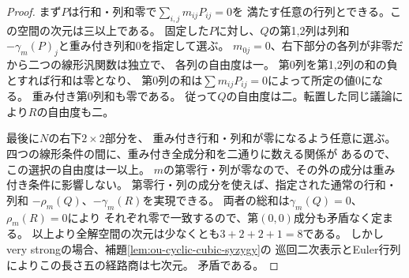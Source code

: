 \begin{proof}
まず$P$は行和・列和零で$\sum_{i,j}m_{ij}P_{ij}=0$を
満たす任意の行列とできる。この空間の次元は三以上である。
固定した$P$に対し、$Q$の第1,2列は列和
$-\gamma_m(P)_j$と重み付き列和0を指定して選ぶ。
$m_{0j}=0$、右下部分の各列が非零だから二つの線形汎関数は独立で、
各列の自由度は一。
第0列を第1,2列の和の負とすれば行和は零となり、
第0列の和は$\sum m_{ij}P_{ij}=0$によって所定の値0になる。
重み付き第0列和も零である。
従って$Q$の自由度は二。転置した同じ議論により$R$の自由度も二。

最後に$N$の右下$2\times2$部分を、
重み付き行和・列和が零になるよう任意に選ぶ。
四つの線形条件の間に、重み付き全成分和を二通りに数える関係が
あるので、この選択の自由度は一以上。
$m$の第零行・列が零なので、その外の成分は重み付き条件に影響しない。
第零行・列の成分を使えば、指定された通常の行和・列和
$-\rho_m(Q)$、$-\gamma_m(R)$を実現できる。
両者の総和は$\gamma_m(Q)=0$、$\rho_m(R)=0$により
それぞれ零で一致するので、第$(0,0)$成分も矛盾なく定まる。
以上より全解空間の次元は少なくとも$3+2+2+1=8$である。
しかしvery strongの場合、補題\ref{lem:ou-cyclic-cubic-syzygy}の
巡回二次表示とEuler行列によりこの長さ五の経路商は七次元。
矛盾である。
\end{proof}

